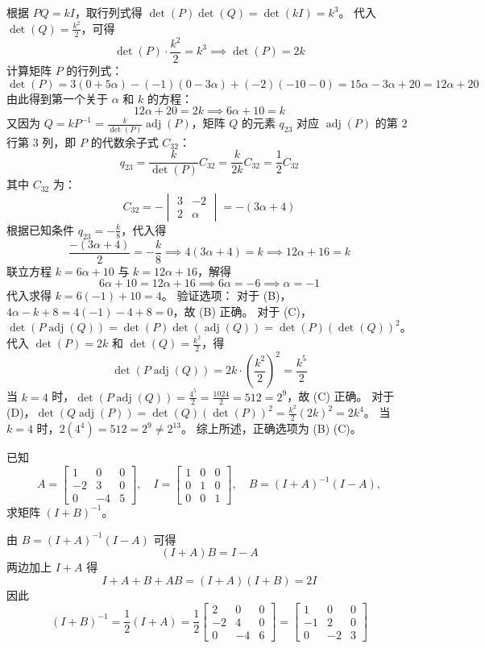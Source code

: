\begin{questions}
\begin{solution}
根据 $PQ = kI$，取行列式得 $\det(P)\det(Q) = \det(kI) = k^3$。
代入 $\det(Q) = \frac{k^2}{2}$，可得
\[
\det(P) \cdot \frac{k^2}{2} = k^3 \implies \det(P) = 2k
\]
计算矩阵 $P$ 的行列式：
\[
\det(P) = 3(0 + 5\alpha) - (-1)(0 - 3\alpha) + (-2)(-10 - 0) = 15\alpha - 3\alpha + 20 = 12\alpha + 20
\]
由此得到第一个关于 $\alpha$ 和 $k$ 的方程：
\[
12\alpha + 20 = 2k \implies 6\alpha + 10 = k
\]
又因为 $Q = kP^{-1} = \frac{k}{\det(P)} \operatorname{adj}(P)$，矩阵 $Q$ 的元素 $q_{23}$ 对应 $\operatorname{adj}(P)$ 的第 2 行第 3 列，即 $P$ 的代数余子式 $C_{32}$：
\[
q_{23} = \frac{k}{\det(P)} C_{32} = \frac{k}{2k} C_{32} = \frac{1}{2} C_{32}
\]
其中 $C_{32}$ 为：
\[
C_{32} = - \begin{vmatrix} 3 & -2 \\ 2 & \alpha \end{vmatrix} = -(3\alpha + 4)
\]
根据已知条件 $q_{23} = -\frac{k}{8}$，代入得
\[
\frac{-(3\alpha + 4)}{2} = -\frac{k}{8} \implies 4(3\alpha + 4) = k \implies 12\alpha + 16 = k
\]
联立方程 $k = 6\alpha + 10$ 与 $k = 12\alpha + 16$，解得
\[
6\alpha + 10 = 12\alpha + 16 \implies 6\alpha = -6 \implies \alpha = -1
\]
代入求得 $k = 6(-1) + 10 = 4$。
验证选项：
对于 (B)，$4\alpha - k + 8 = 4(-1) - 4 + 8 = 0$，故 (B) 正确。
对于 (C)，$\det(P \operatorname{adj}(Q)) = \det(P) \det(\operatorname{adj}(Q)) = \det(P) (\det(Q))^2$。
代入 $\det(P) = 2k$ 和 $\det(Q) = \frac{k^2}{2}$，得
\[
\det(P \operatorname{adj}(Q)) = 2k \cdot \left( \frac{k^2}{2} \right)^2 = \frac{k^5}{2}
\]
当 $k = 4$ 时，$\det(P \operatorname{adj}(Q)) = \frac{4^5}{2} = \frac{1024}{2} = 512 = 2^9$，故 (C) 正确。
对于 (D)，$\det(Q \operatorname{adj}(P)) = \det(Q) (\det(P))^2 = \frac{k^2}{2} (2k)^2 = 2k^4$。
当 $k = 4$ 时，$2(4^4) = 512 = 2^9 \neq 2^{13}$。
综上所述，正确选项为 (B) (C)。
\end{solution}
    \question 已知
    \[
    A=\begin{bmatrix}1&0&0\\ -2&3&0\\ 0&-4&5\end{bmatrix},\quad
    I=\begin{bmatrix}1&0&0\\ 0&1&0\\ 0&0&1\end{bmatrix},\quad
    B=(I+A)^{-1}(I-A),
    \]
    求矩阵 $(I+B)^{-1}$。
    \begin{solution}
        由 $B=(I+A)^{-1}(I-A)$ 可得
        \[
        (I+A)B=I-A
        \]
        两边加上 $I+A$ 得
        \[
        I+A+B+AB =(I+A)(I+B)=2I
        \]
        因此
        \[
        (I+B)^{-1}=\frac{1}{2}(I+A)=\frac{1}{2}\begin{bmatrix}2&0&0\\ -2&4&0\\ 0&-4&6\end{bmatrix}
        =\begin{bmatrix}1&0&0\\ -1&2&0\\ 0&-2&3\end{bmatrix}
        \]
    \end{solution}


\end{questions}
